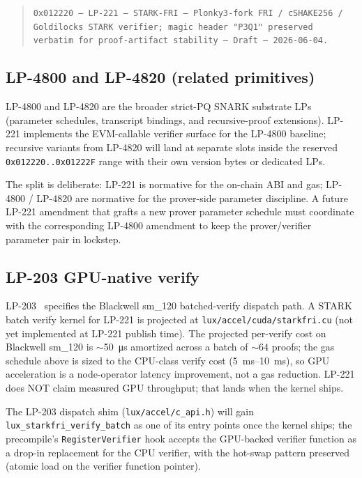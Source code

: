 \begin{quote}
\texttt{0x012220 -- LP-221 -- STARK-FRI -- Plonky3-fork FRI~/
cSHAKE256~/ Goldilocks STARK verifier; magic header "P3Q1"
preserved verbatim for proof-artifact stability -- Draft --
2026-06-04.}
\end{quote}

\subsection{LP-4800 and LP-4820 (related primitives)}

LP-4800 and LP-4820 are the broader strict-PQ SNARK substrate LPs
(parameter schedules, transcript bindings, and recursive-proof
extensions). LP-221 implements the EVM-callable verifier surface
for the LP-4800 baseline; recursive variants from LP-4820 will
land at separate slots inside the reserved \texttt{0x012220..0x01222F}
range with their own version bytes or dedicated LPs.

The split is deliberate: LP-221 is normative for the
on-chain ABI and gas; LP-4800 / LP-4820 are normative for the
prover-side parameter discipline. A future LP-221 amendment that
grafts a new prover parameter schedule must coordinate with the
corresponding LP-4800 amendment to keep the prover/verifier
parameter pair in lockstep.

\subsection{LP-203 GPU-native verify}

LP-203~\cite{lp203} specifies the Blackwell sm\_120 batched-verify
dispatch path. A STARK batch verify kernel for LP-221 is projected
at \texttt{lux/accel/cuda/starkfri.cu} (not yet implemented at
LP-221 publish time). The projected per-verify cost on Blackwell
sm\_120 is $\sim$\SI{50}{\micro\second} amortized across a batch
of $\sim$$64$ proofs; the gas schedule above is sized to the
CPU-class verify cost (\SIrange{5}{10}{\milli\second}), so GPU
acceleration is a node-operator latency improvement, not a gas
reduction. LP-221 does NOT claim measured GPU throughput; that
lands when the kernel ships.

The LP-203 dispatch shim (\texttt{lux/accel/c\_api.h}) will gain
\texttt{lux\_starkfri\_verify\_batch} as one of its entry points
once the kernel ships; the precompile's
\texttt{RegisterVerifier} hook accepts the GPU-backed verifier
function as a drop-in replacement for the CPU verifier, with the
hot-swap pattern preserved (atomic load on the verifier function
pointer).

